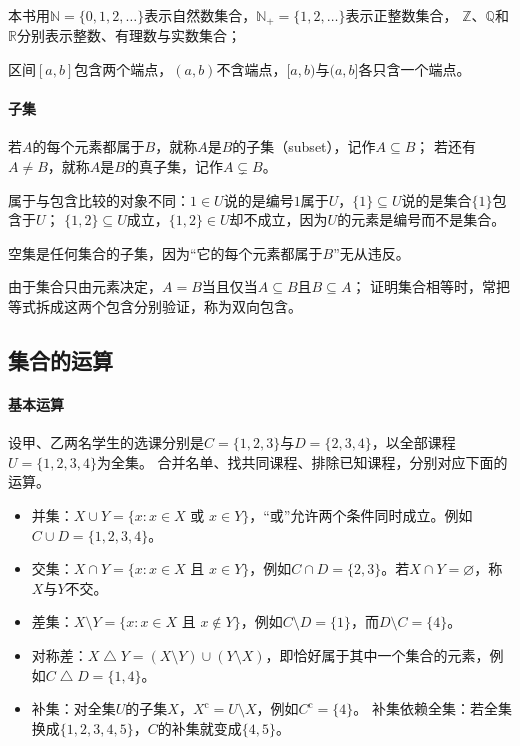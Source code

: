 本书用$\mathbb N=\{0,1,2,\ldots\}$表示自然数集合，$\mathbb N_+=\{1,2,\ldots\}$表示正整数集合，
$\mathbb Z$、$\mathbb Q$和$\mathbb R$分别表示整数、有理数与实数集合；

区间$[a,b]$包含两个端点，$(a,b)$不含端点，$[a,b)$与$(a,b]$各只含一个端点。

\paragraph{子集}
若$A$的每个元素都属于$B$，就称$A$是$B$的子集（subset），记作$A\subseteq B$；
若还有$A\neq B$，就称$A$是$B$的真子集，记作$A\subsetneq B$。

属于与包含比较的对象不同：$1\in U$说的是编号$1$属于$U$，$\{1\}\subseteq U$说的是集合$\{1\}$包含于$U$；
$\{1,2\}\subseteq U$成立，$\{1,2\}\in U$却不成立，因为$U$的元素是编号而不是集合。

空集是任何集合的子集，因为“它的每个元素都属于$B$”无从违反。

由于集合只由元素决定，$A=B$当且仅当$A\subseteq B$且$B\subseteq A$；
证明集合相等时，常把等式拆成这两个包含分别验证，称为双向包含。

\subsection{集合的运算}
\label{sec:prelim-set-operations}

\paragraph{基本运算}
设甲、乙两名学生的选课分别是$C=\{1,2,3\}$与$D=\{2,3,4\}$，以全部课程$U=\{1,2,3,4\}$为全集。
合并名单、找共同课程、排除已知课程，分别对应下面的运算。
\begin{itemize}
 \item 并集：$X\cup Y=\{x:x\in X\text{ 或 }x\in Y\}$，“或”允许两个条件同时成立。例如$C\cup D=\{1,2,3,4\}$。
 \item 交集：$X\cap Y=\{x:x\in X\text{ 且 }x\in Y\}$，例如$C\cap D=\{2,3\}$。若$X\cap Y=\varnothing$，称$X$与$Y$不交。
 \item 差集：$X\setminus Y=\{x:x\in X\text{ 且 }x\notin Y\}$，例如$C\setminus D=\{1\}$，而$D\setminus C=\{4\}$。
 \item 对称差：$X\mathbin{\triangle}Y=(X\setminus Y)\cup(Y\setminus X)$，即恰好属于其中一个集合的元素，例如$C\mathbin{\triangle}D=\{1,4\}$。
 \item 补集：对全集$U$的子集$X$，$X^{\mathrm c}=U\setminus X$，例如$C^{\mathrm c}=\{4\}$。
       补集依赖全集：若全集换成$\{1,2,3,4,5\}$，$C$的补集就变成$\{4,5\}$。
\end{itemize}


